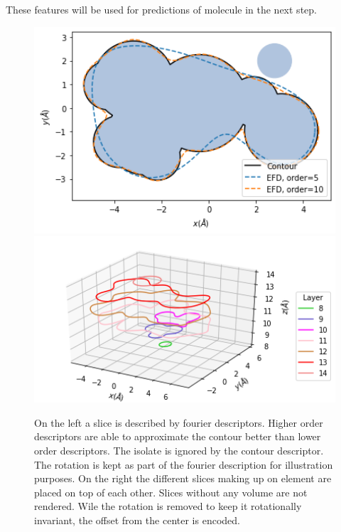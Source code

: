 These features will be used for predictions of molecule in the next step.

\begin{figure}[!htb]
    \includegraphics[width=1.0\textwidth]{figures/fourier/contour.png}
  \endminipage\hfill
    \includegraphics[width=1.0\textwidth]{figures/fourier/fourier-slices.png}
  \endminipage
  \caption{
  On the left a slice is described by fourier descriptors. Higher order descriptors are able to approximate the contour better than lower order descriptors. 
  The isolate is ignored by the contour descriptor. The rotation is kept as part of the fourier description for illustration purposes.
  On the right the different slices making up on element are placed on top of each other. Slices without any volume are not rendered. 
  Wile the rotation is removed to keep it rotationally invariant, the offset from the center is encoded.
  }
  \label{fig:slice}
\end{figure}

